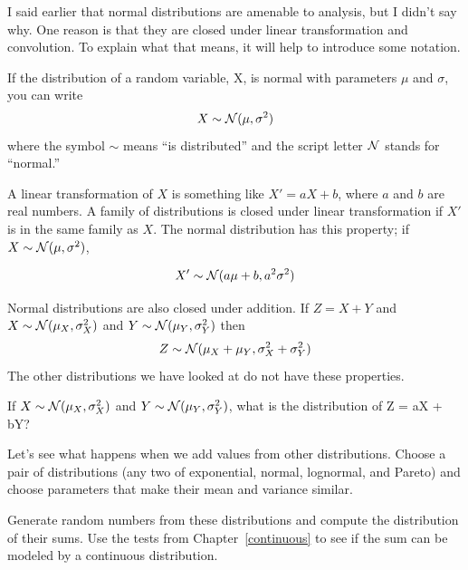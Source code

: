\documentclass[12pt]{book}
\begin{document}
I said earlier that normal distributions are amenable to analysis,
but I didn't say why.  One reason is that they are
closed under linear transformation and convolution.  To explain what
that means, it will help to introduce some notation.

If the distribution of a random variable, X, is
normal with parameters $\mu$ and $\sigma$, you can write
%
\[ X \sim \mathcal{N} (\mu, \sigma^{2})\]
%
where the symbol $\sim$ means ``is distributed'' and the script letter
$\mathcal{N}$ stands for ``normal.''


A linear transformation of $X$ is something like $X' = a X + b$, where
$a$ and $b$ are real numbers.
A family of distributions is closed under
linear transformation if $X'$ is in the same family as $X$.  The normal
distribution has this property; if $X \sim \mathcal{N} (\mu,
\sigma^2)$,

\[ X' \sim \mathcal{N} (a \mu + b, a^{2} \sigma^2)\]

Normal distributions are also closed under addition.  
If $Z = X + Y$ and
$X \sim \mathcal{N} (\mu_{X}, \sigma_{X}^{2})$ and
$Y \sim \mathcal{N} (\mu_{Y}, \sigma_{Y}^{2})$ then
%
\[ Z \sim \mathcal{N} (\mu_X + \mu_Y, \sigma_X^2 + \sigma_Y^2) \]
%
The other distributions we have looked at do not have these
properties.

\begin{exercise}
If 
$X \sim \mathcal{N} (\mu_{X}, \sigma_{X}^{2})$ and
$Y \sim \mathcal{N} (\mu_{Y}, \sigma_{Y}^{2})$, what 
is the distribution of Z = aX + bY?

\end{exercise}

\begin{exercise}
Let's see what happens when we add values from
other distributions.  Choose a pair of distributions (any two of
exponential, normal, lognormal, and Pareto) and choose parameters
that make their mean and variance similar.

Generate random numbers from these distributions and compute the
distribution of their sums.  Use the tests from
Chapter~\ref{continuous} to see if the sum can be modeled by a
continuous distribution.

\end{exercise}
\end{document}
